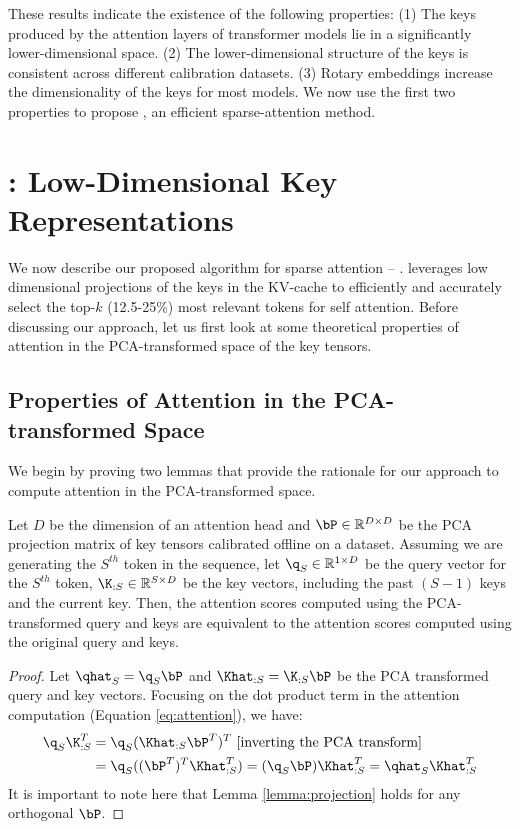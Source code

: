 These results indicate the existence of the following properties: (1) The keys
produced by the attention layers of transformer models lie in a significantly
lower-dimensional space. (2) The lower-dimensional structure of the keys is
consistent across different calibration datasets. (3) Rotary embeddings increase
the dimensionality of the keys for most models. We now use the first two
properties to propose \method, an efficient sparse-attention method. 

\section{\method: Low-Dimensional Key Representations}
\label{sec:loki}
We now describe our proposed algorithm for sparse attention -- \method.
\method leverages low dimensional projections of the keys in the KV-cache to
efficiently and accurately select the top-$k$ (12.5-25\%) most relevant tokens
for self attention.  Before discussing our approach, let us first look at some
theoretical properties of attention in the PCA-transformed space of the key
tensors. 

\subsection{Properties of Attention in the PCA-transformed Space}
\label{subsec:properties}

We begin by proving two lemmas that provide the rationale for our approach to
compute attention in the PCA-transformed space. 

\begin{lemma}
  Let $D$ be the dimension of an attention head and $\bP \in \mathbb{R}^{D \times D}$ be the PCA projection matrix
  of key tensors calibrated offline on a dataset. Assuming we are generating the $S^{\mathit{th}}$ token in the sequence,
   let $\q_S \in \mathbb{R}^{1 \times D}$ be the query vector for the $S^{th}$ token,
  $\K_{:S} \in \mathbb{R}^{S \times D}$ be the key vectors, including the past
  $(S-1)$ keys and the current key. Then, the attention scores computed using
  the PCA-transformed query and keys are equivalent to the attention
  scores computed using the original query and keys.
  \label{lemma:projection}
\end{lemma}
\vspace{-0.2in}
\begin{proof}
  Let $\qhat_S = \q_S\bP$ and $\Khat_{:S} = \K_{:S}\bP$ be the PCA
  transformed query and key vectors. 
  Focusing on the dot product term in the attention computation (Equation \ref{eq:attention}), we have:
  \begin{align*}
    \q_S\K_{:S}^{T} &= \q_S(\Khat_{:S}\bP^{T})^{T} \text{ [inverting the PCA transform]}\\
    &= \q_S((\bP^{T})^{T}\Khat_{:S}^{T}) = (\q_S\bP)\Khat_{:S}^{T} = \qhat_{S}\Khat_{:S}^{T}
  \end{align*}
It is important to note here that Lemma \ref{lemma:projection} holds for 
any orthogonal $\bP$.
  \end{proof}

